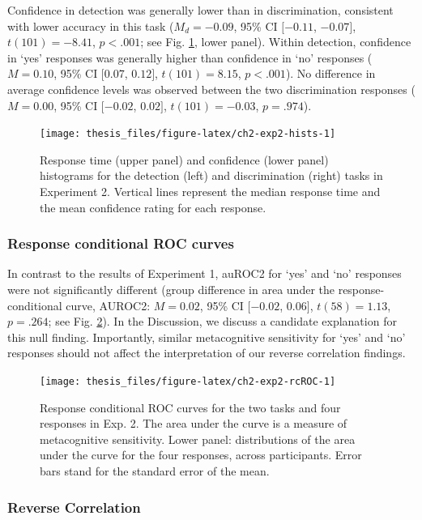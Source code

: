 \documentclass[12pt,twoside]{reedthesis}
\begin{document}
Confidence in detection was generally lower than in discrimination, consistent with lower accuracy in this task (\(M_d = -0.09\), 95\% CI \([-0.11\), \(-0.07]\), \(t(101) = -8.41\), \(p < .001\); see Fig. \ref{fig:ch2-exp2-hists}, lower panel). Within detection, confidence in `yes' responses was generally higher than confidence in `no' responses (\(M = 0.10\), 95\% CI \([0.07\), \(0.12]\), \(t(101) = 8.15\), \(p < .001\)). No difference in average confidence levels was observed between the two discrimination responses (\(M = 0.00\), 95\% CI \([-0.02\), \(0.02]\), \(t(101) = -0.03\), \(p = .974\)).
\begin{figure}
\texttt{[image: thesis\_files/figure-latex/ch2-exp2-hists-1]} \caption[Response time and confidence distributions, Exp. 2]{Response time (upper panel) and confidence (lower panel) histograms for the detection (left) and discrimination (right) tasks in Experiment 2. Vertical lines represent the median response time and the mean confidence rating for each response.}\label{fig:ch2-exp2-hists}
\end{figure}
\hypertarget{response-conditional-roc-curves-1}{%
\subsubsection{Response conditional ROC curves}\label{response-conditional-roc-curves-1}}

In contrast to the results of Experiment 1, auROC2 for `yes' and `no' responses were not significantly different (group difference in area under the response-conditional curve, AUROC2: \(M = 0.02\), 95\% CI \([-0.02\), \(0.06]\), \(t(58) = 1.13\), \(p = .264\); see Fig. \ref{fig:ch2-exp2-rcROC}). In the Discussion, we discuss a candidate explanation for this null finding. Importantly, similar metacognitive sensitivity for `yes' and `no' responses should not affect the interpretation of our reverse correlation findings.
\begin{figure}
\texttt{[image: thesis\_files/figure-latex/ch2-exp2-rcROC-1]} \caption[Response conditional ROC curves for Experiment 2.]{Response conditional ROC curves for the two tasks and four responses in Exp. 2. The area under the curve is a measure of metacognitive sensitivity. Lower panel: distributions of the area under the curve for the four responses, across participants. Error bars stand for the standard error of the mean.}\label{fig:ch2-exp2-rcROC}
\end{figure}
\hypertarget{reverse-correlation-1}{%
\subsubsection{Reverse Correlation}\label{reverse-correlation-1}}
\end{document}
